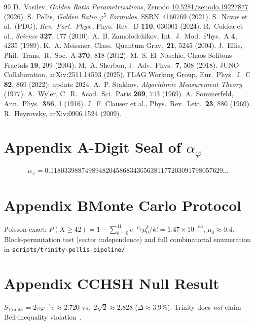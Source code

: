 \documentclass[12pt,a4paper]{article}
\newcommand{\ph}{\varphi}
\newcommand{\aph}{\alpha_{\varphi}}
\begin{document}
\begin{thebibliography}{99}
 D.~Vasilev,
  \textit{Golden Ratio Parametrizations},
  Zenodo \href{https://doi.org/10.5281/zenodo.19227877}{10.5281/zenodo.19227877} (2026).
 S.~Pellis,
  \textit{Golden Ratio $\ph^5$ Formulas}, SSRN~4160769 (2021).
 S.~Navas et al.\ (PDG),
  \textit{Rev.\ Part.\ Phys.},
  Phys.\ Rev.\ D \textbf{110}, 030001 (2024).
 R.~Coldea et al.,
  \textit{Science} \textbf{327}, 177 (2010).
 A.~B. Zamolodchikov,
  Int.\ J.\ Mod.\ Phys.\ A \textbf{4}, 4235 (1989).
 K.~A. Meissner,
  Class.\ Quantum Grav.\ \textbf{21}, 5245 (2004).
 J.~Ellis,
  Phil.\ Trans.\ R.\ Soc.\ A \textbf{370}, 818 (2012).
 M.~S. El~Naschie,
  Chaos Solitons Fractals \textbf{19}, 209 (2004).
 M.~A. Sherbon,
  J.\ Adv.\ Phys.\ \textbf{7}, 508 (2018).
 JUNO Collaboration, arXiv:2511.14593 (2025).
 FLAG Working Group,
  Eur.\ Phys.\ J.\ C \textbf{82}, 869 (2022); update 2024.
 A.~P. Stakhov,
  \textit{Algorithmic Measurement Theory} (1977).
 A.~Wyler,
  C.\ R.\ Acad.\ Sci.\ Paris \textbf{269}, 743 (1969).
 A.~Sommerfeld,
  Ann.\ Phys.\ \textbf{356}, 1 (1916).
 J.~F. Clauser et al.,
  Phys.\ Rev.\ Lett.\ \textbf{23}, 880 (1969).
 R.~Heyrovsky, arXiv:0906.1524 (2009).
\end{thebibliography}

\appendix
\section*{Appendix A-Digit Seal of $\aph$}
\[
\aph = 0.11803398874989482045868343656381177203091798057629\ldots
\]

\section*{Appendix B\quad Monte Carlo Protocol}
Poisson exact:
$P(X\ge42)=1-\sum_{k=0}^{41}e^{-\mu_0}\mu_0^k/k! = 1.47\times10^{-53}$,
$\mu_0\approx0.4$. Block-permutation test (sector independence) and
full combinatorial enumeration in \texttt{scripts/trinity-pellis-pipeline/}.

\section*{Appendix C\quad CHSH Null Result}
$S_{\mathrm{Trinity}}=2\pi\ph^{-1}e\approx2.720$
vs.\ $2\sqrt{2}\approx2.828$ ($\Delta\approx3.9\%$).
Trinity does \emph{not} claim Bell-inequality violation~\cite{chsh1969}.
\end{document}
